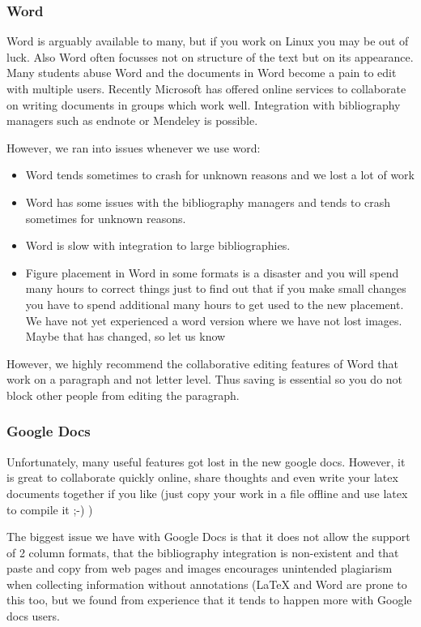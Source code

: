 \subsubsection{Word}\label{word}

Word is arguably available to many, but if you work on Linux you may be
out of luck. Also Word often focusses not on structure of the text but
on its appearance. Many students abuse Word and the documents in Word
become a pain to edit with multiple users. Recently Microsoft has
offered online services to collaborate on writing documents in groups
which work well. Integration with bibliography managers such as endnote
or Mendeley is possible.

However, we ran into issues whenever we use word:

\begin{itemize}

\item
  Word tends sometimes to crash for unknown reasons and we lost a lot of
  work
\item
  Word has some issues with the bibliography managers and tends to crash
  sometimes for unknown reasons.
\item
  Word is slow with integration to large bibliographies.
\item
  Figure placement in Word in some formats is a disaster and you will
  spend many hours to correct things just to find out that if you make
  small changes you have to spend additional many hours to get used to
  the new placement. We have not yet experienced a word version where we
  have not lost images. Maybe that has changed, so let us know
\end{itemize}

However, we highly recommend the collaborative editing features of Word
that work on a paragraph and not letter level. Thus saving is essential
so you do not block other people from editing the paragraph.

\subsubsection{Google Docs}\label{google-docs}

Unfortunately, many useful features got lost in the new google docs.
However, it is great to collaborate quickly online, share thoughts and
even write your latex documents together if you like (just copy your
work in a file offline and use latex to compile it ;-) )

The biggest issue we have with Google Docs is that it does not allow the
support of 2 column formats, that the bibliography integration is
non-existent and that paste and copy from web pages and images
encourages unintended plagiarism when collecting information without
annotations (LaTeX and Word are prone to this too, but we found from
experience that it tends to happen more with Google docs users.

